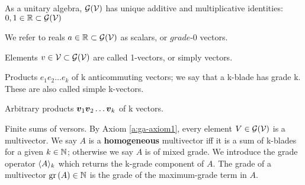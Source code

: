 \begin{definition}[Identities]
    As a unitary algebra, $\mathcal{G}(\mathcal{V})$ has unique additive and multiplicative identities: $0, 1 \in \mathbb{R} \subset \mathcal{G}(\mathcal{V})$
\end{definition}
\begin{definition}[Scalars]
    We refer to reals $a \in \mathbb{R} \subset \mathcal{G}(\mathcal{V})$ as scalars, or $\textit{grade-0}$ vectors.
\end{definition}
\begin{definition}[1-vectors]
    Elements $v \in \mathcal{V} \subset \mathcal{G}(\mathcal{V})$ are called 1-vectors, or simply vectors.
\end{definition}
\begin{definition}[k-blades] \label{d:k-blades}
Products $e_1e_2 \ldots e_k$ of k anticommuting vectors; we say that a k-blade has grade k. These are also called simple k-vectors.
\end{definition}
\begin{definition}[k-versors]
Arbitrary products $\boldsymbol{v}_1\boldsymbol{v}_2 \ldots \boldsymbol{v}_k$ of k vectors.
\end{definition}
\begin{definition}[Multivectors]
	Finite sums of versors. By Axiom \ref{a:ga-axiom1}, every element $V \in \mathcal{G}(\mathcal{V})$ is a multivector. We say $A$ is a \textbf{homogeneous} multivector iff it is a sum of k-blades for a given $k \in \mathbb{N}$; otherwise we say $A$ is of mixed grade.
		We introduce the grade operator $\langle A \rangle_{k}$ which returns the k-grade component of $A$.
		The grade of a multivector $\mathrm{gr}\left(A\right) \in \mathbb{N}$ is the grade of the maximum-grade term in $A$.
\end{definition}
